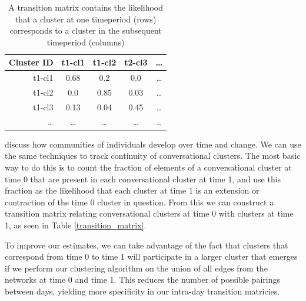 \documentclass[12pt]{article}
\begin{document}
\begin{table}[h]
	\caption{A  transition  matrix  contains  the  likelihood  that  a  cluster  at  one  timeperiod  (rows)  corresponds  to  a cluster in the subsequent timeperiod (columns)}
	
	\begin{center}
	  \begin{tabular}{| r | c  c  c  c |}
	    \hline
	    Cluster ID & t1-cl1   & t1-cl2   & t2-cl3   & \ldots \\ \hline
	    t1-cl1     & 0.68     & 0.2      & 0.0      & \ldots \\ 
	    t1-cl2     & 0.0      & 0.85     & 0.03     & \ldots \\
	    t1-cl3     & 0.13     & 0.04     & 0.45     & \ldots \\
	    \ldots     & \ldots   & \ldots   & \ldots   & \ldots \\
	    \hline
	  \end{tabular}
	\end{center}
	\label{tab:transition_matrix}
\end{table}

\cite{Palla2007} discuss how communities of individuals develop over time and change. We can use the same techniques to track continuity of conversational clusters. The most basic way to do this is to count the fraction of elements of a conversational cluster at time 0 that are present in each conversational cluster at time 1, and use this fraction as the likelihood that each cluster at time 1 is an extension or contraction of the time 0 cluster in question. From this we can construct a transition matrix relating conversational clusters at time 0 with clusters at time 1, as seen in Table \ref{transition_matrix}.

To improve our estimates, we can take advantage of the fact that clusters that correspond from time 0 to time 1 will participate in a larger cluster that emerges if we perform our clustering algorithm on the union of all edges from the networks at time 0 and time 1. This reduces the number of possible pairings between days, yielding more specificity in our intra-day transition matricies.
\end{document}
